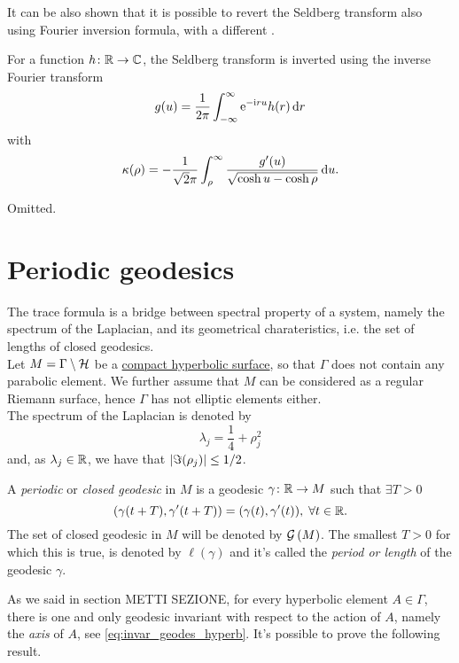 It can be also shown that it is possible to revert the Seldberg transform also using Fourier inversion formula, with a different .

\begin{nprop}
\label{prop:inverse_seld_transform}
For a function $h\colon\mathbb{R}\to\mathbb{C}$, the Seldberg transform is inverted using the inverse Fourier transform
\[
g(u)=\frac{1}{2\pi}\int_{-\infty}^{\infty}\mathrm{e}^{-\mathrm{i} ru}h(r)\mathop{}\!\mathrm{d} r
\]
with 
\[
\kappa(\rho)=-\frac{1}{\sqrt{2}\pi}\int_{\rho}^{\infty}\frac{g'(u)}{\sqrt{\cosh u-\cosh\rho}}\mathop{}\!\mathrm{d} u.
\]
\end{nprop}
\begin{prf}
Omitted.
\end{prf}


\section{Periodic geodesics}

\label{sec:period_geodesics}


The trace formula is a bridge between spectral property of a system, namely the spectrum of the Laplacian, and its geometrical charateristics, i.e. the set of lengths of closed geodesics.\\
Let $M=\Gamma\setminus\mathcal{H}$ be a \underline{compact hyperbolic surface}, so that $\Gamma$ does not contain any parabolic element. We further assume that $M$ can be considered as a regular Riemann surface, hence $\Gamma$ has not elliptic elements either.\\
The spectrum of the Laplacian is denoted by 
\[
\lambda_{j}=\frac{1}{4}+\rho_{j}^{2}
\]
and, as $\lambda_{j}\in\mathbb{R}$, we have that $\left| \Im(\rho_{j})\right|\leq1/2$.


\begin{defin}
\label{def:closed_geod}
A \emph{periodic} or \emph{closed geodesic} in $M$ is a geodesic $\gamma\colon\mathbb{R}\to M $ such that $\exists T>0$
\[
(\gamma(t+T),\gamma'(t+T))=(\gamma(t),\gamma'(t)),\;\forall t\in\mathbb{R}.
\] 
The set of closed geodesic in $M$ will be denoted by $\mathcal{G}\left(M\right)$. The smallest $T>0$ for which this is true, is denoted by $\ell(\gamma)$ and it's called the \emph{period or length} of the geodesic $\gamma$. 
\end{defin}

As we said in section METTI SEZIONE, for every hyperbolic element $A\in\Gamma$, there is one and only geodesic invariant with respect to the action of $A$, namely the \emph{axis} of $A$, see \eqref{eq:invar_geodes_hyperb}. It's possible to prove the following result.



